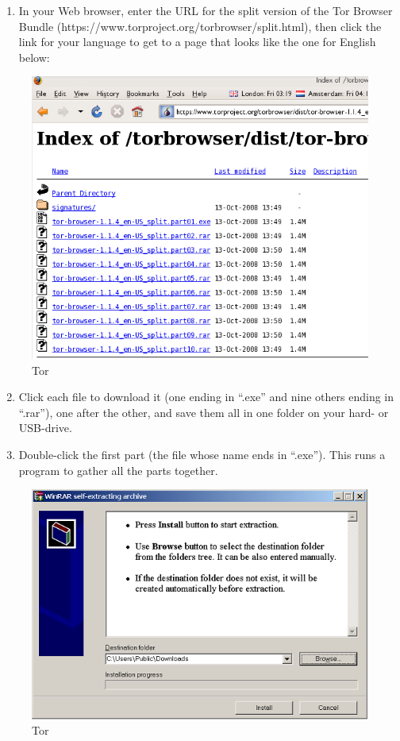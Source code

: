 \begin{enumerate}[1.]
\item
  In your Web browser, enter the URL for the split version of the Tor
  Browser Bundle (https://www.torproject.org/torbrowser/split.html),
  then click the link for your language to get to a page that looks like
  the one for English below:
\end{enumerate}
\begin{figure}[htbp]
\centering
\includegraphics{tor_4.png}
\caption{Tor}
\end{figure}

\begin{enumerate}[1.]
\setcounter{enumi}{1}
\item
  Click each file to download it (one ending in ``.exe'' and nine others
  ending in ``.rar''), one after the other, and save them all in one
  folder on your hard- or USB-drive.
\item
  Double-click the first part (the file whose name ends in ``.exe'').
  This runs a program to gather all the parts together.
\end{enumerate}
\begin{figure}[htbp]
\centering
\includegraphics{tor_5.png}
\caption{Tor}
\end{figure}

